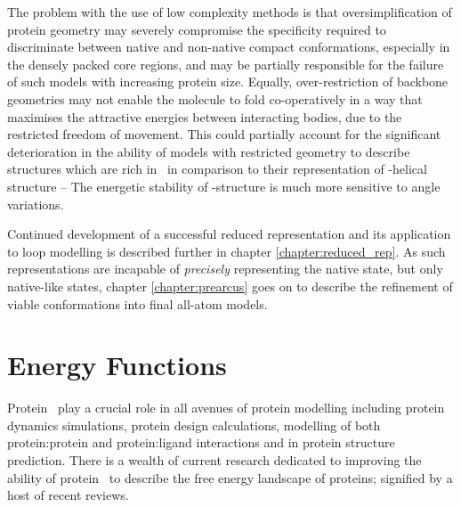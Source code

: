 The problem with the use of low complexity methods is that oversimplification of protein geometry may severely compromise the specificity required to discriminate between native and non-native compact conformations, especially in the densely packed core regions, and may be partially responsible for the failure of such models with increasing protein size. Equally, over-restriction of backbone geometries may not enable the molecule to fold co-operatively in a way that maximises the attractive energies between interacting bodies, due to the restricted freedom of movement. This could partially account for the significant deterioration in the ability of models with restricted geometry to describe structures which are rich in \bstrands\ in comparison to their representation of \mbox{\al-helical} structure -- The energetic stability of \mbox{\be-structure} is much more sensitive to angle variations\cite{COMPCHEM:Gib2001}.

Continued development of a successful reduced
representation\cite{COMPCHEM:Gib2001} and its application to loop modelling is described further in chapter \ref{chapter:reduced_rep}.
As such representations are incapable of \emph{precisely} representing the native state,
but only native-like states, chapter \ref{chapter:prearcus} goes on to describe the refinement of viable conformations into final all-atom models.






\section{Energy Functions}
\label{section:protmodel:energy_functions}

Protein \forcefields\ play a crucial role in all avenues of protein modelling
including protein dynamics simulations, protein design calculations, modelling
of both protein:protein and protein:ligand interactions and in protein structure prediction. There is a wealth of current research dedicated to improving the ability of protein \forcefields\ to describe the free energy landscape of proteins; signified by a host of recent reviews\cite{FORCEFIELD:REVIEW:1,FORCEFIELD:REVIEW:2,FORCEFIELD:REVIEW:3,FORCEFIELD:REVIEW:4}.


